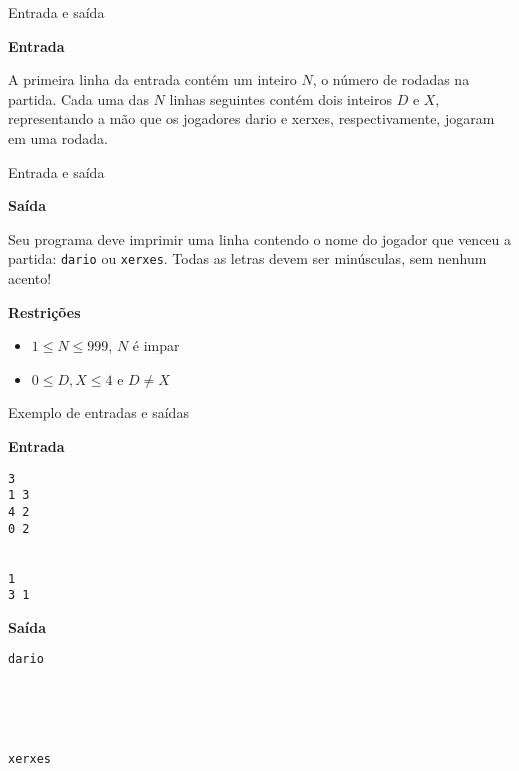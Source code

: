 \begin{frame}[fragile]{Entrada e saída}

\textbf{Entrada}

A primeira linha da entrada contém um inteiro $N$, o número de rodadas na partida. Cada uma das
$N$ linhas seguintes contém dois inteiros $D$ e $X$, representando a mão que os jogadores dario e
xerxes, respectivamente, jogaram em uma rodada.

\end{frame}

\begin{frame}[fragile]{Entrada e saída}

\textbf{Saída}

Seu programa deve imprimir uma linha contendo o nome do jogador que venceu a partida:
\texttt{dario} ou \texttt{xerxes}. Todas as letras devem ser minúsculas, sem nenhum acento!

\vspace{0.1in}

\textbf{Restrições}

\begin{itemize}
    \item $1\leq N\leq 999$, $N$ é impar
    \item $0\leq D, X\leq 4$ e $D\neq X$
\end{itemize}

\end{frame}

\begin{frame}[fragile]{Exemplo de entradas e saídas}

\begin{minipage}[t]{0.45\textwidth}
\textbf{Entrada}
\begin{verbatim}
3
1 3
4 2
0 2


1
3 1
\end{verbatim}
\end{minipage}
\begin{minipage}[t]{0.5\textwidth}
\textbf{Saída}
\begin{verbatim}
dario





xerxes
\end{verbatim}
\end{minipage}
\end{frame}

